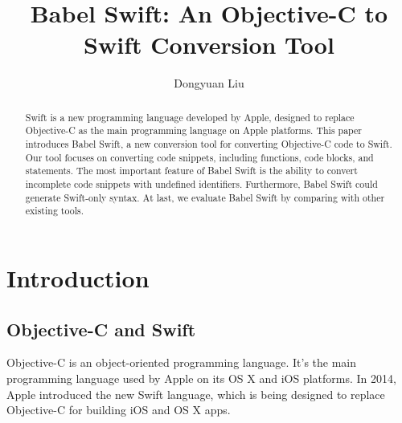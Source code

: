 \documentclass{sfuthesis}
\title{Babel Swift: An Objective-C to Swift Conversion Tool}
\author{Dongyuan Liu}
\begin{document}
\frontmatter
\maketitle{}
\makecommittee{}

\begin{abstract}
Swift is a new programming language developed by Apple, designed to replace Objective-C as the main programming language on Apple platforms. This paper introduces Babel Swift, a new conversion tool for converting Objective-C code to Swift. Our tool focuses on converting code snippets, including functions, code blocks, and statements. The most important feature of Babel Swift is the ability to convert incomplete code snippets with undefined identifiers. Furthermore, Babel Swift could generate Swift-only syntax. At last, we evaluate Babel Swift by comparing with other existing tools.
\end{abstract}


\begin{dedication} %
\end{dedication}


\begin{acknowledgements} %
\end{acknowledgements}

\tableofcontents\clearpage
{}\listoftables\clearpage
{}\listoffigures





%
%

\mainmatter%

\chapter{Introduction}

\section{Objective-C and Swift}

Objective-C is an object-oriented programming language. It's the main programming language used by Apple on its OS X and iOS platforms. In 2014, Apple introduced the new Swift language, which is being designed to replace Objective-C for building iOS and OS X apps.
\end{document}
